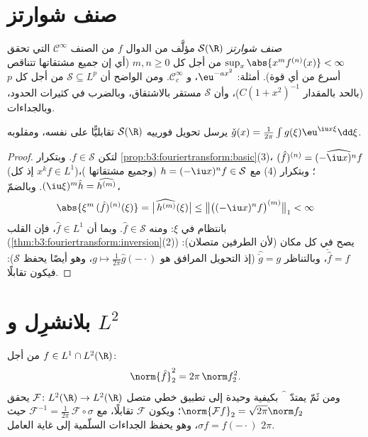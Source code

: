 \section{صنف شوارتز}

\begin{definition}\label{def:b3:fouriertransform:schwartz}
\emph{صنف شوارتز} $\mathcal
S(\R)$ مؤلَّف من الدوال $f$
من الصنف $\mathcal C^\infty$ التي تحقق $\sup_x\abs{x^m f^{(n)}(x)} < \infty$ من أجل كل $m, n \geq 0$ (أي إن
جميع مشتقاتها تتناقص أسرع من أي قوة). أمثلة: $\eu^{-ax^2}$،
و $\mathcal C_c^\infty$. ومن الواضح أن $\mathcal S
\subseteq L^p$ من أجل كل $p$ (بالحد بالمقدار
$C(1 + x^2)^{-1}$)، وأن $\mathcal S$ مستقر بالاشتقاق، وبالضرب في كثيرات
الحدود، وبالجداءات.
\end{definition}

\begin{theorem}\label{thm:b3:fouriertransform:schwartz}
يرسل تحويل فورييه $\mathcal S(\R)$ تقابليًّا على نفسه، ومقلوبه
$\check g(x) = \frac1{2\pi}\int
g(\xi)\eu^{\iu x\xi}\dd\xi$.
\end{theorem}

\begin{proof}
لتكن $f \in \mathcal S$. وبتكرار \cref{prop:b3:fouriertransform:basic}(3)، $(\hat f)^{(n)} =
\widehat{(-\iu x)^nf}$ (إذ كل
$x^kf \in L^1$)؛ وبتكرار (4) مع $h = (-\iu x)^nf \in \mathcal S$ (وجميع مشتقاتها )، $(\iu\xi)^m\hat h =
\widehat{h^{(m)}}$. وبالضمّ،
\[
\abs{\xi^m\,(\hat f)^{(n)}(\xi)}
= \bigl|\widehat{\,h^{(m)}}(\xi)\bigr|
\leq \bigl\|\bigl((-\iu x)^nf\bigr)^{(m)}\bigr\|_1 < \infty
\]
بانتظام في $\xi$: ومنه $\hat f \in \mathcal S$. وبما أن $\hat f \in L^1$، فإن
القلب (\cref{thm:b3:fouriertransform:inversion}(2)) يصح في كل مكان (لأن الطرفين متصلان):
$\check{\hat f} = f$، وبالتناظر $\widehat{\check g} = g$ (إذ التحويل المرافق هو $g \mapsto \frac1{2\pi}\hat g(-\cdot)$، وهو
أيضًا يحفظ $\mathcal S$): فيكون تقابلًا.
\end{proof}

\section{بلانشرِل و \texorpdfstring{$L^2$}{L2}}

\begin{theorem}[بلانشرِل]\label{thm:b3:fouriertransform:plancherel}
من أجل $f \in L^1 \cap L^2(\R)$:
\[
\norm{\hat f}_2^2 = 2\pi\,\norm f_2^2 .
\]
ومن ثَمّ يمتدّ $\widehat{\phantom f}$ بكيفية وحيدة إلى تطبيق خطي متصل $\mathcal F \colon L^2(\R) \to L^2(\R)$
يحقق $\norm{\mathcal Ff}_2 = \sqrt{2\pi}\norm f_2$؛ ويكون $\mathcal
F$ تقابلًا، مع $\mathcal F^{-1} =
\frac1{2\pi}\,\mathcal F\circ\sigma$ حيث $\sigma f =
f(-\cdot)$، وهو
يحفظ الجداءات السلّمية إلى غاية العامل $2\pi$.
\end{theorem}

